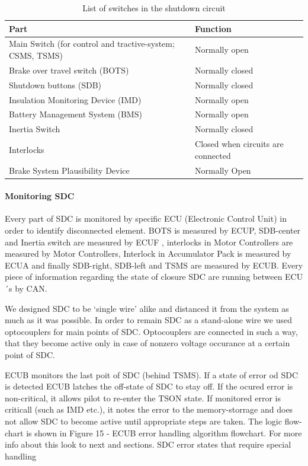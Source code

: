 \begin{table}[H]
	\caption{List of switches in the shutdown circuit}
	\centering
	\begin{tabularx}{\textwidth}{|X|l|}
		\hline Part  & Function \\[\TableSize]
		\hline Main Switch (for control and tractive-system; CSMS, TSMS) & Normally open \\[\TableSize]
		\hline Brake over travel switch (BOTS) & Normally closed \\[\TableSize]
		\hline Shutdown buttons (SDB) & Normally closed \\[\TableSize]
		\hline Insulation Monitoring Device (IMD) & Normally open \\[\TableSize]
		\hline Battery Management System (BMS) & Normally open \\[\TableSize]
		\hline Inertia Switch & Normally closed \\[\TableSize]
		\hline Interlocks & Closed when circuits are connected \\[\TableSize]
		\hline Brake System Plausibility Device & Normally Open \\[\TableSize]
		\hline
	\end{tabularx}%
	\label{tab:SDCswitch}%
\end{table}%


\paragraph{Monitoring SDC}
Every part of SDC is monitored by specific ECU (Electronic Control Unit) in order to identify disconnected element. BOTS is measured by ECUP, SDB-center and Inertia switch are measured by ECUF , interlocks in Motor Controllers are measured by Motor Controllers, Interlock in Accumulator Pack is measured by ECUA and finally SDB-right, SDB-left and TSMS are measured by ECUB. Every piece of information regarding the state of closure SDC are running between ECU´s by CAN.

We designed SDC to be ‘single wire’ alike and distanced it from the system as much as it was possible. In order to remain SDC as a stand-alone wire we used optocouplers for main points of SDC. Optocouplers are connected in such a way, that they become active only in case of nonzero voltage occurance at a certain point of SDC.

ECUB monitors the last poit of SDC (behind TSMS). If a state of error od SDC is detected ECUB latches the off-state of SDC to stay off. If the ocured error is non-critical, it allows pilot to re-enter the TSON state. If monitored error is criticall (such as IMD etc.), it notes the error to the memory-storrage and does not allow SDC to become active until appropriate steps are taken. The logic flow-chart is shown in Figure 15 - ECUB error handling algorithm flowchart. For more info about this look to next and  sections.
SDC error states that require special handling

